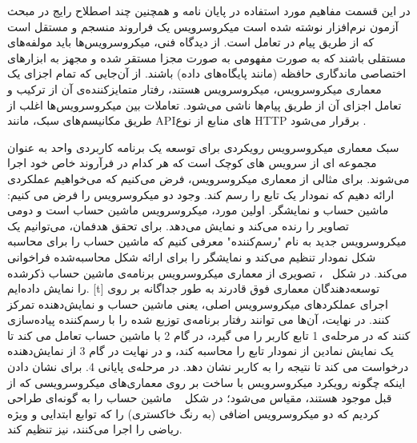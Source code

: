 

در این قسمت مفاهیم مورد استفاده در پایان نامه و همچنین چند اصطلاح رایج در مبحث آزمون نرم‌افزار نوشته شده است
میکروسرویس یک فراروند منسجم و مستقل است که از طریق پیام‌ در تعامل است. از دیدگاه فنی، میکروسرویس‌ها باید مولفه‌های مستقلی باشند که به صورت مفهومی به صورت مجزا مستقر شده و مجهز به ابزارهای اختصاصی ماندگاری حافظه (مانند پایگاه‌های داده) باشند. از آن‌جایی که تمام اجزای یک معماری میکروسرویس، میکروسرویس هستند، رفتار متمایزکننده‌ی آن از ترکیب و تعامل اجزای آن از طریق پیام‌ها ناشی می‌شود. تعاملات بین میکروسرویس‌ها اغلب از طریق مکانیسم‌های سبک، مانند APIهای منابع از نوع HTTP برقرار می‌شود . 


سبک معماری میکروسرویس رویکردی برای توسعه یک برنامه کاربردی واحد به عنوان مجموعه ای از سرویس های کوچک است که هر کدام در فرآروند خاص خود اجرا می‌شوند. برای مثالی از معماری میکروسرویس، فرض می‌کنیم که می‌خواهیم عملکردی ارائه دهیم که نمودار یک تابع را رسم کند. وجود دو میکروسرویس را فرض می کنیم: ماشین حساب و نمایشگر. اولین مورد، میکروسرویس ماشین حساب است و دومی تصاویر را رنده می‌کند و نمایش می‌دهد. برای تحقق هدفمان، می‌توانیم یک میکروسرویس جدید به نام "رسم‌کننده" معرفی کنیم که ماشین حساب را برای محاسبه شکل نمودار تنظیم می‌کند و نمایشگر را برای ارائه شکل محاسبه‌شده فراخوانی می‌کند. در شکل ~، تصویری از معماری میکروسرویس برنامه‌ی ماشین حساب ذکر‌شده را نمایش داده‌ایم.
[t]
\vspace{0.5em}
توسعه‌دهندگان معماری فوق قادرند به طور جداگانه بر روی اجرای عملکردهای میکروسرویس اصلی، یعنی ماشین حساب و نمایش‌دهنده تمرکز کنند. 
در نهایت، آن‌ها می توانند رفتار برنامه‌ی توزیع شده را با رسم‌کننده پیاده‌سازی کنند که در مرحله‌ی 1 تابع کاربر را می گیرد، در گام 2 با ماشین حساب تعامل می کند تا یک نمایش نمادین از نمودار تابع را محاسبه کند، و در نهایت در گام 3 از نمایش‌دهنده درخواست می کند تا نتیجه را به کاربر نشان دهد. 
در مرحله‌‌ی پایانی 4. برای نشان دادن اینکه چگونه رویکرد میکروسرویس با ساخت بر روی معماری‌های میکروسرویسی که از قبل موجود هستند، مقیاس می‌شود؛ 
در شکل ~ ماشین حساب را به ‌گونه‌ای طراحی کردیم که دو میکروسرویس اضافی (به رنگ خاکستری) را که توابع ابتدایی و ویژه ریاضی را اجرا می‌کنند، نیز تنظیم کند. 

